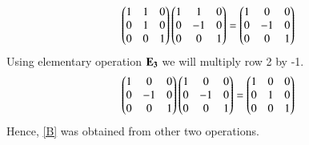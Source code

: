 \documentclass[journal,12pt,twocolumn]{IEEEtran}
\begin{document}
 \begin{align}
  \begin{pmatrix}1&1&0\\0&1&0\\0&0&1\end{pmatrix} \begin{pmatrix}1&1&0\\0&-1&0\\0&0&1\end{pmatrix}=
 \begin{pmatrix}1&0&0\\0&-1&0\\0&0&1\end{pmatrix}
 \end{align}
 Using elementary operation $\bf{E}_3$ we will multiply row 2 by -1.
 \begin{align}
   \begin{pmatrix}1&0&0\\0&-1&0\\0&0&1\end{pmatrix} \begin{pmatrix}1&0&0\\0&-1&0\\0&0&1\end{pmatrix}=
\begin{pmatrix}1&0&0\\0&1&0\\0&0&1\end{pmatrix}
 \end{align}
 Hence, \eqref{B} was obtained from other two operations.
  
\end{document}
